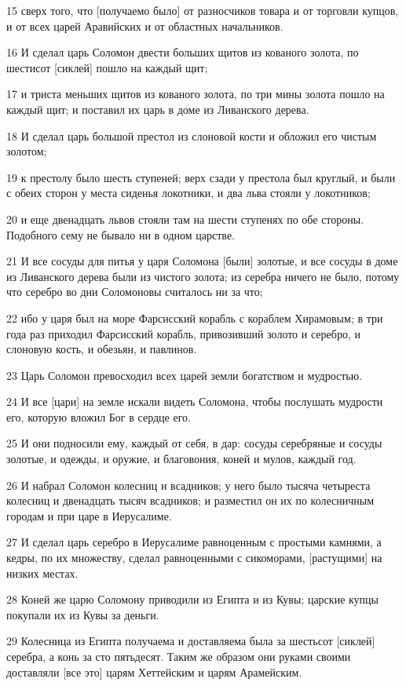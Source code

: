 \par 15 сверх того, что [получаемо было] от разносчиков товара и от торговли купцов, и от всех царей Аравийских и от областных начальников.
\par 16 И сделал царь Соломон двести больших щитов из кованого золота, по шестисот [сиклей] пошло на каждый щит;
\par 17 и триста меньших щитов из кованого золота, по три мины золота пошло на каждый щит; и поставил их царь в доме из Ливанского дерева.
\par 18 И сделал царь большой престол из слоновой кости и обложил его чистым золотом;
\par 19 к престолу было шесть ступеней; верх сзади у престола был круглый, и были с обеих сторон у места сиденья локотники, и два льва стояли у локотников;
\par 20 и еще двенадцать львов стояли там на шести ступенях по обе стороны. Подобного сему не бывало ни в одном царстве.
\par 21 И все сосуды для питья у царя Соломона [были] золотые, и все сосуды в доме из Ливанского дерева были из чистого золота; из серебра ничего не было, потому что серебро во дни Соломоновы считалось ни за что;
\par 22 ибо у царя был на море Фарсисский корабль с кораблем Хирамовым; в три года раз приходил Фарсисский корабль, привозивший золото и серебро, и слоновую кость, и обезьян, и павлинов.
\par 23 Царь Соломон превосходил всех царей земли богатством и мудростью.
\par 24 И все [цари] на земле искали видеть Соломона, чтобы послушать мудрости его, которую вложил Бог в сердце его.
\par 25 И они подносили ему, каждый от себя, в дар: сосуды серебряные и сосуды золотые, и одежды, и оружие, и благовония, коней и мулов, каждый год.
\par 26 И набрал Соломон колесниц и всадников; у него было тысяча четыреста колесниц и двенадцать тысяч всадников; и разместил он их по колесничным городам и при царе в Иерусалиме.
\par 27 И сделал царь серебро в Иерусалиме равноценным с простыми камнями, а кедры, по их множеству, сделал равноценными с сикоморами, [растущими] на низких местах.
\par 28 Коней же царю Соломону приводили из Египта и из Кувы; царские купцы покупали их из Кувы за деньги.
\par 29 Колесница из Египта получаема и доставляема была за шестьсот [сиклей] серебра, а конь за сто пятьдесят. Таким же образом они руками своими доставляли [все это] царям Хеттейским и царям Арамейским.

